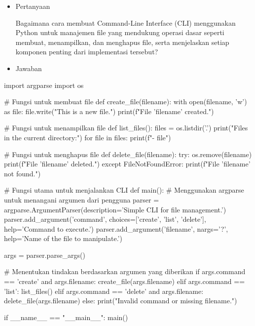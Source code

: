 \documentclass[12pt]{article}
\begin{document}
\begin{itemize}
    \item Pertanyaan
    
    Bagaimana cara membuat Command-Line Interface (CLI) menggunakan Python untuk manajemen file yang mendukung operasi dasar seperti membuat, menampilkan, dan menghapus file, serta menjelaskan setiap komponen penting dari implementasi tersebut?
\end{itemize}
\begin{itemize}
    \item Jawaban
\end{itemize}
\begin{python}
import argparse
import os

# Fungsi untuk membuat file
def create_file(filename):
    with open(filename, 'w') as file:
        file.write("This is a new file.")
    print(f"File '{filename}' created.")

# Fungsi untuk menampilkan file
def list_files():
    files = os.listdir('.')
    print("Files in the current directory:")
    for file in files:
        print(f"- {file}")

# Fungsi untuk menghapus file
def delete_file(filename):
    try:
        os.remove(filename)
        print(f"File '{filename}' deleted.")
    except FileNotFoundError:
        print(f"File '{filename}' not found.")

# Fungsi utama untuk menjalankan CLI
def main():
    # Menggunakan argparse untuk menangani argumen dari pengguna
    parser = argparse.ArgumentParser(description='Simple CLI for file management.')
    parser.add_argument('command', choices=['create', 'list', 'delete'], help='Command to execute.')
    parser.add_argument('filename', nargs='?', help='Name of the file to manipulate.')

    args = parser.parse_args()

    # Menentukan tindakan berdasarkan argumen yang diberikan
    if args.command == 'create' and args.filename:
        create_file(args.filename)
    elif args.command == 'list':
        list_files()
    elif args.command == 'delete' and args.filename:
        delete_file(args.filename)
    else:
        print("Invalid command or missing filename.")

if __name__ == "__main__":
    main()
\end{python}
\end{document}
